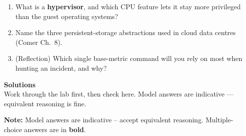 \documentclass[11pt]{article}
\begin{document}
\begin{enumerate}
      it ultimately protects.
\item What is a \textbf{hypervisor}, and which CPU feature lets it stay more privileged than the guest
      operating systems?
\item Name the three persistent-storage abstractions used in cloud data centres (Comer Ch.~8).
\item (Reflection) Which single base-metric command will you rely on most when hunting an incident,
      and why?
\end{enumerate}

\signoff

\clearpage
\solheader
{\LARGE\bfseries\color{kred} Solutions}\\[2pt]
{\small Work through the lab first, then check here. Model answers are indicative — equivalent reasoning is fine.}\par\vspace{8pt}
\noindent\textbf{Note:} Model answers are indicative -- accept equivalent reasoning. Multiple-choice
answers are in \textbf{bold}.
\end{document}
